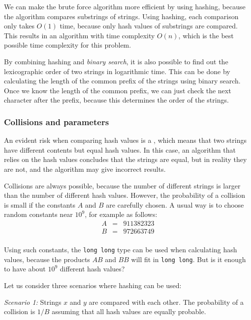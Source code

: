 We can make the brute force algorithm more efficient
by using hashing, because the algorithm compares
substrings of strings.
Using hashing, each comparison only takes $O(1)$ time,
because only hash values of substrings are compared.
This results in an algorithm with time complexity $O(n)$,
which is the best possible time complexity for this problem.

By combining hashing and \emph{binary search},
it is also possible to find out the lexicographic order of
two strings in logarithmic time.
This can be done by calculating the length
of the common prefix of the strings using binary search.
Once we know the length of the common prefix,
we can just check the next character after the prefix,
because this determines the order of the strings.

\subsubsection*{Collisions and parameters}


An evident risk when comparing hash values is
a , which means that two strings have
different contents but equal hash values.
In this case, an algorithm that relies on
the hash values concludes that the strings are equal,
but in reality they are not,
and the algorithm may give incorrect results.

Collisions are always possible,
because the number of different strings is larger
than the number of different hash values.
However, the probability of a collision is small
if the constants $A$ and $B$ are carefully chosen.
A usual way is to choose random constants
near $10^9$, for example as follows:
\[
\begin{array}{lcl}
A & = & 911382323 \\
B & = & 972663749 \\
\end{array}
\]

Using such constants,
the \texttt{long long} type can be used
when calculating hash values,
because the products $AB$ and $BB$ will fit in \texttt{long long}.
But is it enough to have about $10^9$ different hash values?

Let us consider three scenarios where hashing can be used:

\textit{Scenario 1:} Strings $x$ and $y$ are compared with
each other.
The probability of a collision is $1/B$ assuming that
all hash values are equally probable.

